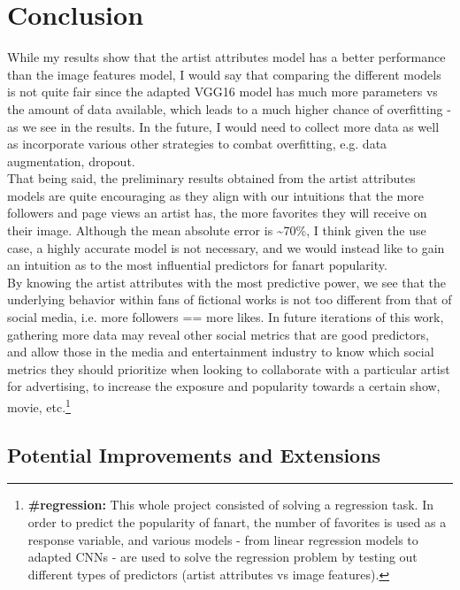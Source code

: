 \documentclass[11pt]{article}
\begin{document}
    \section{Conclusion}

While my results show that the artist attributes model has a better
performance than the image features model, I would say that comparing
the different models is not quite fair since the adapted VGG16 model has
much more parameters vs the amount of data available, which leads to a
much higher chance of overfitting - as we see in the results. In the
future, I would need to collect more data as well as incorporate various
other strategies to combat overfitting, e.g. data augmentation, dropout.\\

That being said, the preliminary results obtained from the artist
attributes models are quite encouraging as they align with our
intuitions that the more followers and page views an artist has, the
more favorites they will receive on their image. Although the mean
absolute error is \textasciitilde{}70\%, I think given the use case, a
highly accurate model is not necessary, and we would instead like to
gain an intuition as to the most influential predictors for fanart
popularity.\\

By knowing the artist attributes with the most predictive power, we see
that the underlying behavior within fans of fictional works is not too
different from that of social media, i.e. more followers == more likes.
In future iterations of this work, gathering more data may reveal other
social metrics that are good predictors, and allow those in the media
and entertainment industry to know which social metrics they should
prioritize when looking to collaborate with a particular artist for
advertising, to increase the exposure and popularity towards a certain
show, movie, etc.\footnote{\textbf{\#regression:} This whole project consisted of solving a regression task. In order to predict the popularity of fanart, the number of favorites is used as a response variable, and various models - from linear regression models to adapted CNNs - are used to solve the regression problem by testing out different types of predictors (artist attributes vs image features).}

\subsection{Potential Improvements and Extensions}
\end{document}

